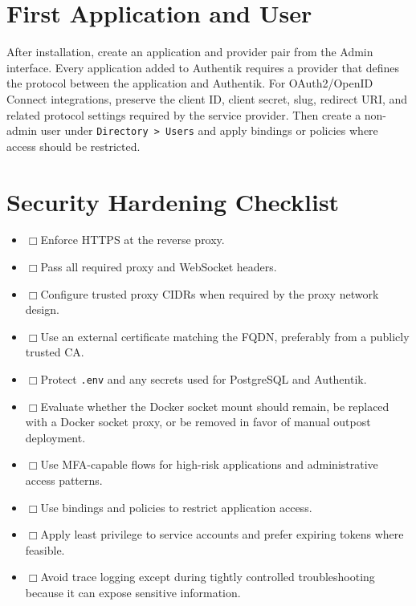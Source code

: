 \documentclass[11pt]{article}
\newcommand{\checkbox}{$\Box$\hspace{0.4em}}
\begin{document}
\section*{First Application and User}
After installation, create an application and provider pair from the Admin interface. Every application added to Authentik requires a provider that defines the protocol between the application and Authentik. For OAuth2/OpenID Connect integrations, preserve the client ID, client secret, slug, redirect URI, and related protocol settings required by the service provider. Then create a non-admin user under \texttt{Directory > Users} and apply bindings or policies where access should be restricted.

\section*{Security Hardening Checklist}
\begin{itemize}
\item \checkbox Enforce HTTPS at the reverse proxy.
\item \checkbox Pass all required proxy and WebSocket headers.
\item \checkbox Configure trusted proxy CIDRs when required by the proxy network design.
\item \checkbox Use an external certificate matching the FQDN, preferably from a publicly trusted CA.
\item \checkbox Protect \texttt{.env} and any secrets used for PostgreSQL and Authentik.
\item \checkbox Evaluate whether the Docker socket mount should remain, be replaced with a Docker socket proxy, or be removed in favor of manual outpost deployment.
\item \checkbox Use MFA-capable flows for high-risk applications and administrative access patterns.
\item \checkbox Use bindings and policies to restrict application access.
\item \checkbox Apply least privilege to service accounts and prefer expiring tokens where feasible.
\item \checkbox Avoid trace logging except during tightly controlled troubleshooting because it can expose sensitive information.
\end{itemize}
\end{document}
